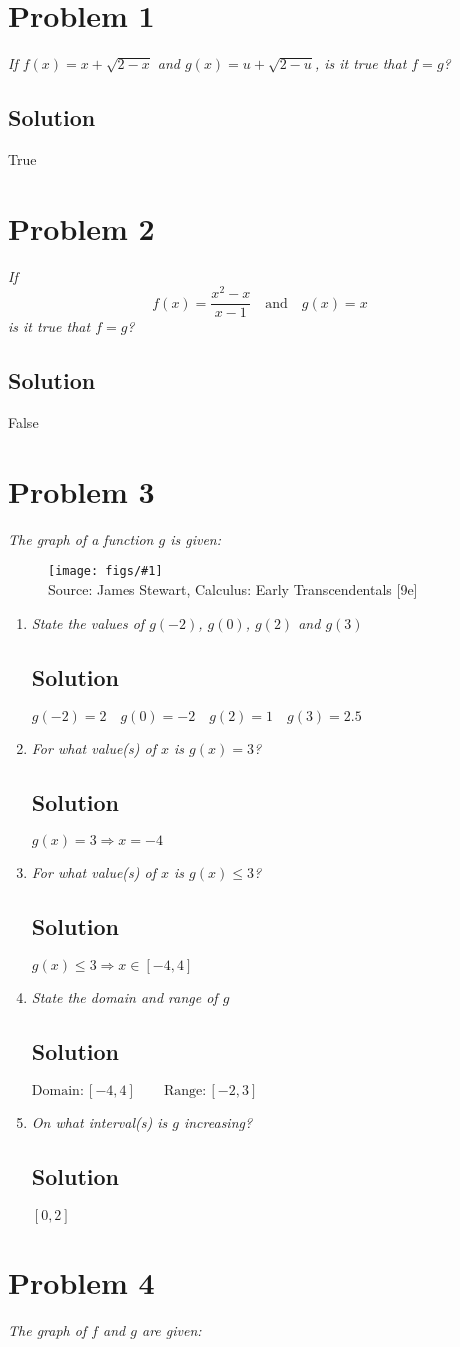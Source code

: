 \documentclass[11pt]{article}
\newcommand{\soln}{\subsection*}
\newcommand{\qn}{\textit}
\newcommand{\imagesource}[1]{{\footnotesize Source: #1}}
\newcommand{\img}[1]{
	\begin{figure}[h]
		\centering
		\texttt{[image: figs/\#1]}\\
		\imagesource{James Stewart, Calculus: Early Transcendentals [9e]}
	\end{figure}
}
\begin{document}
\section*{Problem 1}

\qn{If $f(x)=x+\sqrt{2-x}$ and $g(x)=u+\sqrt{2-u}$, is it true that $f=g$?}

\soln{Solution}

True


\section*{Problem 2}

\qn{If $$f(x)=\frac{x^2-x}{x-1} \quad\mathrm{and}\quad g(x)=x$$ is it true that $f=g$?}

\soln{Solution}

False

\section*{Problem 3}

\qn{The graph of a function $g$ is given:}

\img{1.1.3}

\begin{enumerate}
	\item \qn{State the values of $g(-2)$, $g(0)$, $g(2)$ and $g(3)$}
	\soln{Solution}
	$g(-2)=2 \quad g(0)=-2 \quad g(2)=1 \quad g(3)=2.5$
	
	\item \qn{For what value(s) of $x$ is $g(x)=3$?}
	\soln{Solution}
	$g(x)=3 \Rightarrow x=-4$
	
	\item \qn{For what value(s) of $x$ is $g(x) \leq 3$?}
	\soln{Solution}
	$g(x) \leq 3 \Rightarrow x \in [-4,4]$
	
	\item \qn{State the domain and range of $g$}
	\soln{Solution}
	$\mathrm{Domain}:[-4,4] \qquad\mathrm{Range}:[-2,3]$
	
	\item \qn{On what interval(s) is $g$ increasing?}
	\soln{Solution}
	$[0,2]$
\end{enumerate}

\section*{Problem 4}

\qn{The graph of $f$ and $g$ are given:}
\end{document}
